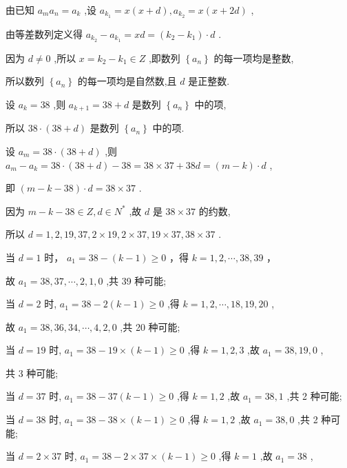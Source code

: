 \documentclass[10pt]{article}
\begin{document}
由已知 \({a}_{m}{a}_{n} = {a}_{k}\) ,设 \({a}_{{k}_{1}} = x\left( {x + d}\right) ,{a}_{{k}_{2}} = x\left( {x + {2d}}\right)\) ,

由等差数列定义得 \({a}_{{k}_{2}} - {a}_{{k}_{1}} = {xd} = \left( {{k}_{2} - {k}_{1}}\right)  \cdot  d\) .

因为 \(d \neq  0\) ,所以 \(x = {k}_{2} - {k}_{1} \in  Z\) ,即数列 \(\left\{  {a}_{n}\right\}\) 的每一项均是整数,

所以数列 \(\left\{  {a}_{n}\right\}\) 的每一项均是自然数,且 \(d\) 是正整数.

设 \({a}_{k} = {38}\) ,则 \({a}_{k + 1} = {38} + d\) 是数列 \(\left\{  {a}_{n}\right\}\) 中的项,

所以 \({38} \cdot  \left( {{38} + d}\right)\) 是数列 \(\left\{  {a}_{n}\right\}\) 中的项.

设 \({a}_{m} = {38} \cdot  \left( {{38} + d}\right)\) ,则 \({a}_{m} - {a}_{k} = {38} \cdot  \left( {{38} + d}\right)  - {38} = {38} \times  {37} + {38d} = \left( {m - k}\right)  \cdot  d\) ,

即 \(\left( {m - k - {38}}\right)  \cdot  d = {38} \times  {37}\) .

因为 \(m - k - {38} \in  Z,d \in  {N}^{ * }\) ,故 \(d\) 是 \({38} \times  {37}\) 的约数,

所以 \(d = 1,2,{19},{37},2 \times  {19},2 \times  {37},{19} \times  {37},{38} \times  {37}\) .

当 \(d = 1\) 时， \({a}_{1} = {38} - \left( {k - 1}\right)  \geq  0\) ，得 \(k = 1,2,\cdots ,{38},{39}\) ，

故 \({a}_{1} = {38},{37},\cdots ,2,1,0\) ,共 39 种可能;

当 \(d = 2\) 时, \({a}_{1} = {38} - 2\left( {k - 1}\right)  \geq  0\) ,得 \(k = 1,2,\cdots ,{18},{19},{20}\) ,

故 \({a}_{1} = {38},{36},{34},\cdots ,4,2,0\) ,共 20 种可能;

当 \(d = {19}\) 时, \({a}_{1} = {38} - {19} \times  \left( {k - 1}\right)  \geq  0\) ,得 \(k = 1,2,3\) ,故 \({a}_{1} = {38},{19},0\) ,

共 3 种可能;

当 \(d = {37}\) 时, \({a}_{1} = {38} - {37}\left( {k - 1}\right)  \geq  0\) ,得 \(k = 1,2\) ,故 \({a}_{1} = {38},1\) ,共 2 种可能;

当 \(d = {38}\) 时, \({a}_{1} = {38} - {38} \times  \left( {k - 1}\right)  \geq  0\) ,得 \(k = 1,2\) ,故 \({a}_{1} = {38},0\) ,共 2 种可能;

当 \(d = 2 \times  {37}\) 时, \({a}_{1} = {38} - 2 \times  {37} \times  \left( {k - 1}\right)  \geq  0\) ,得 \(k = 1\) ,故 \({a}_{1} = {38}\) ,
\end{document}
